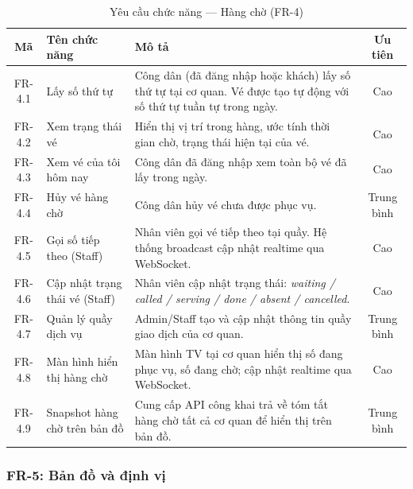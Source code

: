 \begin{table}[H]
\centering
\caption{Yêu cầu chức năng — Hàng chờ (FR-4)}
\label{tab:fr-queue}
\begin{tabularx}{\textwidth}{|c|l|X|c|}
\hline
\textbf{Mã} & \textbf{Tên chức năng} & \textbf{Mô tả} & \textbf{Ưu tiên} \\
\hline
FR-4.1 & Lấy số thứ tự &
  Công dân (đã đăng nhập hoặc khách) lấy số thứ tự tại cơ quan.
  Vé được tạo tự động với số thứ tự tuần tự trong ngày. &
  Cao \\
\hline
FR-4.2 & Xem trạng thái vé &
  Hiển thị vị trí trong hàng, ước tính thời gian chờ,
  trạng thái hiện tại của vé. &
  Cao \\
\hline
FR-4.3 & Xem vé của tôi hôm nay &
  Công dân đã đăng nhập xem toàn bộ vé đã lấy trong ngày. &
  Cao \\
\hline
FR-4.4 & Hủy vé hàng chờ &
  Công dân hủy vé chưa được phục vụ. &
  Trung bình \\
\hline
FR-4.5 & Gọi số tiếp theo (Staff) &
  Nhân viên gọi vé tiếp theo tại quầy.
  Hệ thống broadcast cập nhật realtime qua WebSocket. &
  Cao \\
\hline
FR-4.6 & Cập nhật trạng thái vé (Staff) &
  Nhân viên cập nhật trạng thái: \textit{waiting / called / serving /
  done / absent / cancelled}. &
  Cao \\
\hline
FR-4.7 & Quản lý quầy dịch vụ &
  Admin/Staff tạo và cập nhật thông tin quầy giao dịch của cơ quan. &
  Trung bình \\
\hline
FR-4.8 & Màn hình hiển thị hàng chờ &
  Màn hình TV tại cơ quan hiển thị số đang phục vụ, số đang chờ;
  cập nhật realtime qua WebSocket. &
  Cao \\
\hline
FR-4.9 & Snapshot hàng chờ trên bản đồ &
  Cung cấp API công khai trả về tóm tắt hàng chờ tất cả cơ quan
  để hiển thị trên bản đồ. &
  Trung bình \\
\hline
\end{tabularx}
\end{table}

\subsubsection{FR-5: Bản đồ và định vị}

